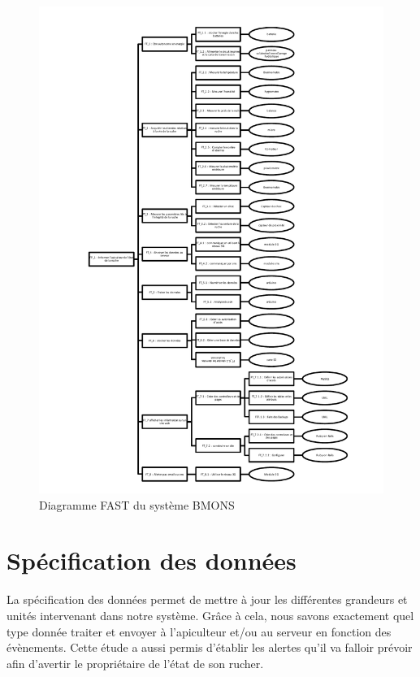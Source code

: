 \clearpage

\begin{figure}[h!]
\centering\includegraphics[scale=0.7]{FAST_BMONS.pdf}
\caption{\label{fig:fast} Diagramme FAST du système BMONS}
\end{figure}


\section{Spécification des données}
La spécification des données permet de mettre à jour les différentes grandeurs 
et unités intervenant dans notre système. Grâce à cela, nous savons exactement 
quel type donnée traiter et envoyer à l'apiculteur et/ou au serveur en fonction des évènements. Cette étude a aussi permis d'établir les alertes qu'il va falloir prévoir afin d'avertir le propriétaire de l'état de son rucher. 

